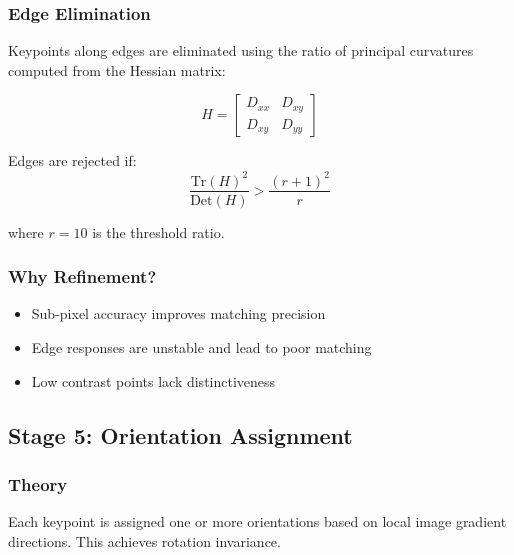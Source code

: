 \documentclass[12pt,a4paper]{article}
\begin{document}
\subsubsection{Edge Elimination}
Keypoints along edges are eliminated using the ratio of principal curvatures computed from the Hessian matrix:

\begin{equation}
H = \begin{bmatrix}
D_{xx} & D_{xy} \\
D_{xy} & D_{yy}
\end{bmatrix}
\end{equation}

Edges are rejected if:
\begin{equation}
\frac{\text{Tr}(H)^2}{\text{Det}(H)} > \frac{(r+1)^2}{r}
\end{equation}

where $r = 10$ is the threshold ratio.

\subsubsection{Why Refinement?}
\begin{itemize}
    \item Sub-pixel accuracy improves matching precision
    \item Edge responses are unstable and lead to poor matching
    \item Low contrast points lack distinctiveness
\end{itemize}

\subsection{Stage 5: Orientation Assignment}

\subsubsection{Theory}
Each keypoint is assigned one or more orientations based on local image gradient directions. This achieves rotation invariance.
\end{document}
